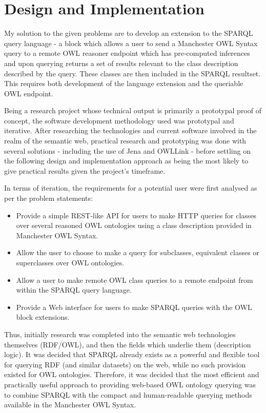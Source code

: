 \documentclass{article}
\begin{document}
\section{Design and Implementation}

My solution to the given problems are to develop an extension to the SPARQL
query language - a block which allows a user to send a Manchester OWL Syntax query to a
remote OWL reasoner endpoint which has pre-computed inferences and upon querying
returns a set of results relevant to the class description described by the
query. These classes are then included in the SPARQL resultset. This requires 
both development of the language extension and the queriable OWL endpoint.

Being a research project whose technical output is primarily a prototypal proof
of concept, the software development methodology used was prototypal and
iterative. After researching the technologies and current software involved in
the realm of the semantic web, practical research and prototyping was done with 
several solutions - including the use of Jena and OWLLink - before settling on
the following design and implementation approach as being the most likely to
give practical results given the project's timeframe.

In terms of iteration, the requirements for a potential user were first analysed 
as per the problem statements:

\begin{itemize}
    \item Provide a simple REST-like API for users to make HTTP queries for
    classes over several reasoned OWL ontologies using a class description
    provided in Manchester OWL Syntax.
    \item Allow the user to choose to make a query for subclasses, equivalent
    classes or superclasses over OWL ontologies.
    \item Allow a user to make remote OWL class queries to a remote endpoint from 
    within the SPARQL query language.
    \item Provide a Web interface for users to make SPARQL queries with the OWL
    block extensions.
\end{itemize}

Thus, initially research was completed into the semantic web technologies
themselves (RDF/OWL), and then the fields which underlie them (description
logic). It was decided that SPARQL already exists as a powerful and flexible
tool for querying RDF (and similar datasets) on the web, while no such provision
existed for OWL ontologies. Therefore, it was decided that the most efficient
and practically useful approach to providing web-based OWL ontology querying was
to combine SPARQL with the compact and human-readable querying methods available
in the Manchester OWL Syntax. 
\end{document}
